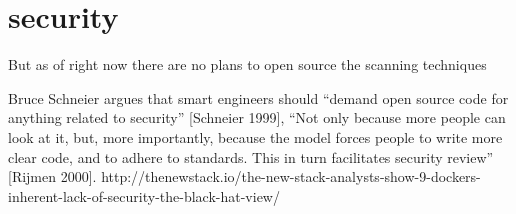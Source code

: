 \section{security}


%


But as of right now there are no plans to open source the scanning techniques


Bruce Schneier argues that smart engineers should “demand open source code for anything related to security” [Schneier 1999],
“Not only because more people can look at it, but, more importantly, because the model forces people to write more clear code, and to adhere to standards. This in turn facilitates security review” [Rijmen 2000].
http://thenewstack.io/the-new-stack-analysts-show-9-dockers-inherent-lack-of-security-the-black-hat-view/


